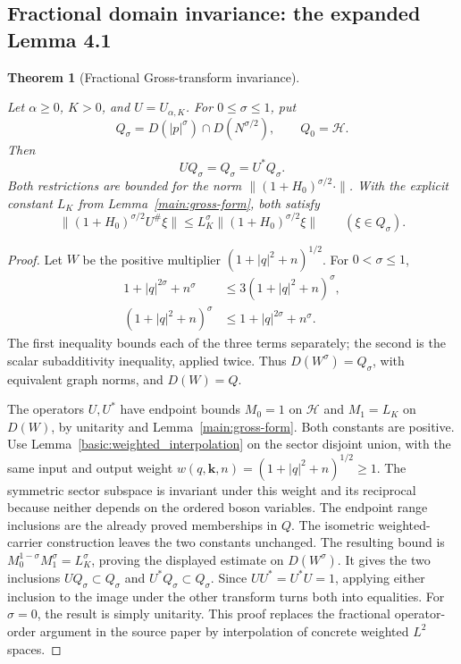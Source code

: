 \documentclass[11pt,a4paper]{article}
\newtheorem{theorem}{Theorem}[section]
\theoremstyle{definition}
\theoremstyle{remark}
\newcommand{\proofid}[1]{\par\smallskip{\normalfont\scriptsize\color{inkblue}Stable ID: \nolinkurl{#1}}\par\smallskip}
\begin{document}
\subsection{Fractional domain invariance: the expanded Lemma 4.1}

\begin{theorem}[Fractional Gross-transform invariance]
\label{reg:invariance}
\proofid{reg:invariance}
\par{}\par\smallskip

Let \(\alpha\geq0\), \(K>0\), and \(U=U_{\alpha,K}\). For \(0\leq\sigma\leq1\), put
\[
 Q_\sigma=D(|p|^\sigma)\cap D(N^{\sigma/2}),\qquad Q_0=\mathcal H.
\]
Then
\[
 UQ_\sigma=Q_\sigma=U^*Q_\sigma.
\]
Both restrictions are bounded for the norm
\(\|(1+H_0)^{\sigma/2}\cdot\|\).
With the explicit constant $L_K$ from Lemma~\ref{main:gross-form},
both satisfy
\[
 \|(1+H_0)^{\sigma/2}U^{\#}\xi\|
 \leq L_K^\sigma\|(1+H_0)^{\sigma/2}\xi\|
       \qquad(\xi\in Q_\sigma).
\]
\end{theorem}
\begin{proof}
Let \(W\) be the positive multiplier \((1+|q|^2+n)^{1/2}\).  For
\(0<\sigma\leq1\),
\begin{align*}
 1+|q|^{2\sigma}+n^\sigma
 &\leq 3(1+|q|^2+n)^\sigma,\\
 (1+|q|^2+n)^\sigma
 &\leq1+|q|^{2\sigma}+n^\sigma.
\end{align*}
The first inequality bounds each of the three terms separately; the second
is the scalar subadditivity inequality, applied twice.  Thus
\(D(W^\sigma)=Q_\sigma\), with equivalent graph norms, and
\(D(W)=Q\).

The operators \(U,U^*\) have endpoint bounds $M_0=1$ on
\(\mathcal H\) and $M_1=L_K$ on \(D(W)\), by unitarity
and Lemma~\ref{main:gross-form}. Both constants are positive.
Use Lemma~\ref{basic:weighted_interpolation} on the sector
disjoint union, with the same input and output weight
$w(q,\mathbf k,n)=(1+|q|^2+n)^{1/2}\geq1$. The symmetric
sector subspace is invariant under this weight and its reciprocal
because neither depends on the ordered boson variables. The
endpoint range inclusions are the already proved memberships in
$Q$. The isometric weighted-carrier construction leaves the two
constants unchanged. The resulting bound is
$M_0^{1-\sigma}M_1^\sigma=L_K^\sigma$, proving the displayed
estimate on \(D(W^\sigma)\). It gives the two inclusions
\(UQ_\sigma\subset Q_\sigma\) and \(U^*Q_\sigma\subset Q_\sigma\).
Since \(UU^*=U^*U=1\), applying either inclusion to the image under the
other transform turns both into equalities.  For \(\sigma=0\), the result
is simply unitarity.  This proof replaces the fractional operator-order
argument in the source paper by interpolation of concrete weighted
\(L^2\) spaces.
\end{proof}
\end{document}

